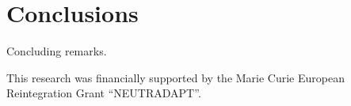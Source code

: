 %

\section{Conclusions}
\label{sec:conclusions}

Concluding remarks. 


\begin{acknowledgements}
This research was financially supported by the Marie Curie European
Reintegration Grant ``NEUTRADAPT''.
\end{acknowledgements}



